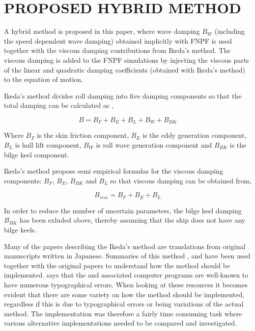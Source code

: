 \section*{PROPOSED HYBRID METHOD}\label{proposed-hybrid-method}

A hybrid method is proposed in this paper, where wave damping $B_W$
(including the speed dependent wave damping) obtained implicitly with
FNPF is used together with the viscous damping contributions from
Ikeda's method. The viscous damping is added to the FNPF simulations by
injecting the viscous parts of the linear and quadratic damping
coefficients (obtained with Ikeda's method) to the equation of motion.

Ikeda's method divides roll damping into five damping components so that
the total damping can be calculated as \citep{7505983/937PN5DT},

\begin{equation}
B = B_F + B_E + B_L + B_W + B_{BK}
\end{equation}

Where $B_F$ is the skin friction component, $B_E$ is the eddy
generation component, $B_L$ is hull lift component, $B_W$ is roll
wave generation component and $B_{BK}$ is the bilge keel component.

Ikeda's method propose semi empirical formulas for the
viscous damping components: $B_F$, $B_E$, $B_{BK}$ and $B_L$ so
that viscous damping can be obtained from,

\begin{equation}
\label{eq:viscous damping}
B_{visc} = B_F + B_E + B_L
\end{equation}

In order to reduce the number of uncertain parameters, the bilge keel
damping $B_{BK}$ has been exluded above, thereby assuming that the
ship does not have any bilge keels.

Many of the papers describing the Ikeda's method are translations from original manuscripts written in
Japanese. Summaries of this method \citep{7505983/FB64RGPF},
\citep{7505983/KAKIM2E2} and \citep{7505983/UGK6YEVD} have been used
together with the original papers to understand how the method should be
implemented. \citep{7505983/UGK6YEVD} says that the \citep{7505983/FB64RGPF} and associated
computer programs are well-known to have numerous typographical errors.
When looking at these resources it becomes evident that there are some
variety on how the method should be implemented, regardless if this is
due to typographical errors or being variations of the actual method.
The implementation was therefore a fairly time consuming task where
various alternative implementations needed to be compared and
investigated.

